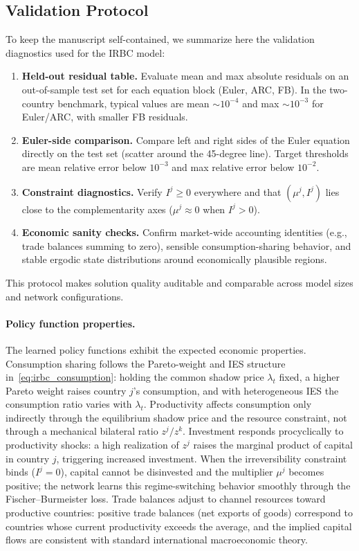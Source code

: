 \documentclass[11pt,a4paper]{report}
\begin{document}
\subsection*{Validation Protocol}
To keep the manuscript self-contained, we summarize here the validation diagnostics used for the IRBC model:
\begin{enumerate}[itemsep=2pt]
\item \textbf{Held-out residual table.}  Evaluate mean and max absolute residuals on an out-of-sample test set for each equation block (Euler, ARC, FB).  In the two-country benchmark, typical values are mean $\sim 10^{-4}$ and max $\sim 10^{-3}$ for Euler/ARC, with smaller FB residuals.
\item \textbf{Euler-side comparison.}  Compare left and right sides of the Euler equation directly on the test set (scatter around the 45-degree line).  Target thresholds are mean relative error below $10^{-3}$ and max relative error below $10^{-2}$.
\item \textbf{Constraint diagnostics.}  Verify $I^j \ge 0$ everywhere and that $(\mu^j, I^j)$ lies close to the complementarity axes ($\mu^j \approx 0$ when $I^j > 0$).
\item \textbf{Economic sanity checks.}  Confirm market-wide accounting identities (e.g., trade balances summing to zero), sensible consumption-sharing behavior, and stable ergodic state distributions around economically plausible regions.
\end{enumerate}
This protocol makes solution quality auditable and comparable across model sizes and network configurations.

\paragraph{Policy function properties.}
The learned policy functions exhibit the expected economic properties.  Consumption sharing follows the Pareto-weight and IES structure in~\eqref{eq:irbc_consumption}: holding the common shadow price $\lambda_t$ fixed, a higher Pareto weight raises country $j$'s consumption, and with heterogeneous IES the consumption ratio varies with $\lambda_t$.  Productivity affects consumption only indirectly through the equilibrium shadow price and the resource constraint, not through a mechanical bilateral ratio $z^j/z^k$.  Investment responds procyclically to productivity shocks: a high realization of $z^j$ raises the marginal product of capital in country $j$, triggering increased investment.  When the irreversibility constraint binds ($I^j = 0$), capital cannot be disinvested and the multiplier $\mu^j$ becomes positive; the network learns this regime-switching behavior smoothly through the Fischer--Burmeister loss.  Trade balances adjust to channel resources toward productive countries: positive trade balances (net exports of goods) correspond to countries whose current productivity exceeds the average, and the implied capital flows are consistent with standard international macroeconomic theory.
\end{document}
